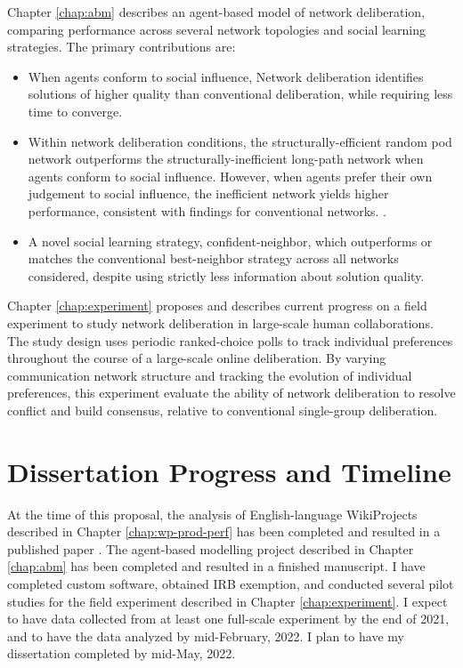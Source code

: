 Chapter \ref{chap:abm} describes an agent-based model of network deliberation,
comparing performance across several network topologies and social learning
strategies.
The primary contributions are:
\begin{itemize}
\setlength\itemsep{0pt}
\item When agents conform to social influence,
Network deliberation identifies solutions of higher quality than
conventional deliberation,
while requiring less time to converge.
\item Within network deliberation conditions,
the structurally-efficient random pod network outperforms the
structurally-inefficient long-path network when agents conform to social influence.
However, when agents prefer their own judgement to social influence,
the inefficient network yields higher performance,
consistent with findings for conventional networks.
\cite{barkoczi_social_2016}.
\item A novel social learning strategy, confident-neighbor,
which outperforms or matches the conventional best-neighbor strategy across all
networks considered,
despite using strictly less information about solution quality.
\end{itemize}

Chapter \ref{chap:experiment} proposes and describes current progress on a
field experiment to study network deliberation in large-scale human collaborations.
The study design uses periodic ranked-choice polls to track individual preferences
throughout the course of a large-scale online deliberation.
By varying communication network structure and tracking the evolution of individual
preferences,
this experiment evaluate the ability of network deliberation to resolve conflict
and build consensus, relative to conventional single-group deliberation.

\section{Dissertation Progress and Timeline}
At the time of this proposal,
the analysis of English-language WikiProjects described in Chapter
\ref{chap:wp-prod-perf} has been completed and resulted in a published
paper \cite{platt_network_2018}.
The agent-based modelling project described in Chapter \ref{chap:abm}
has been completed and resulted in a finished manuscript.
I have completed custom software, obtained IRB exemption, and conducted
several pilot studies for the field experiment described in
Chapter \ref{chap:experiment}.
I expect to have data collected from at least one full-scale experiment
by the end of 2021, and to have the data analyzed by mid-February, 2022.
I plan to have my dissertation completed by mid-May, 2022.
